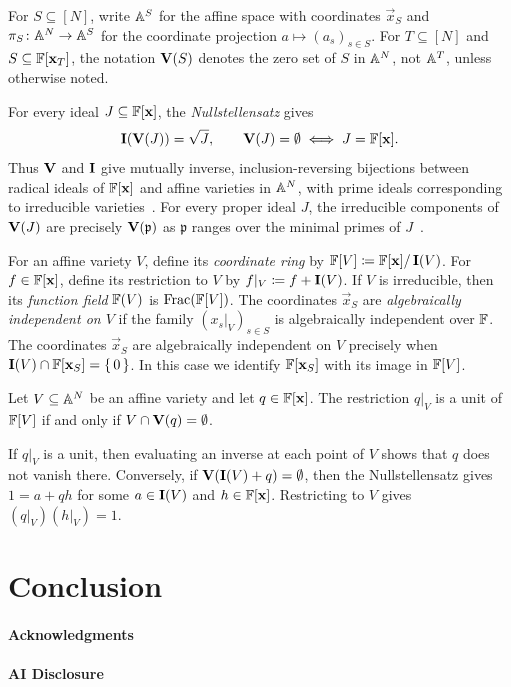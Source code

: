 \documentclass[11pt,letterpaper,dvipsnames]{article}
\begin{document}
For $S \subseteq [N]$, write $\mathbb{A}^S$ for the affine space with coordinates $\vec{x}_S$ and $\pi_S \colon \mathbb{A}^N \to \mathbb{A}^S$ for the coordinate projection $a \mapsto (a_s)_{s \in S}$.
For $T \subseteq [N]$ and $S \subseteq \F[\vec{x}_T]$, the notation $\operatorname{\mathbf{V}}(S)$ denotes the zero set of $S$ in $\mathbb{A}^N$, not $\mathbb{A}^T$, unless otherwise noted.

For every ideal $J \subseteq \F[\vec{x}]$, the \emph{Nullstellensatz} gives 
\[ 
    \I(\V(J)) = \sqrt{J}, \qquad \V(J) = \emptyset \iff J = \F[\vec{x}]. 
\]
Thus $\operatorname{\mathbf{V}}$ and $\operatorname{\mathbf{I}}$ give mutually inverse, inclusion-reversing bijections between radical ideals of $\F[\vec{x}]$ and affine varieties in $\mathbb{A}^N$, with prime ideals corresponding to irreducible varieties~\cite[Chapter~4, \S2, Theorems~6--7; \S5, Corollary~4]{CLO25}.
For every proper ideal $J$, the irreducible components of $\operatorname{\mathbf{V}}(J)$ are precisely $\operatorname{\mathbf{V}}(\mathfrak p)$ as $\mathfrak p$ ranges over the minimal primes of $J$~\cite[Corollary~I.1.4 and Proposition~I.1.5]{Har77}.

For an affine variety $V$, define its \emph{coordinate ring} by $\F[V] \defeq \F[\vec{x}]/\I(V)$.
For $f \in \F[\vec{x}]$, define its restriction to $V$ by $f|_V \coloneqq f + \operatorname{\mathbf{I}}(V)$.
If $V$ is irreducible, then its \emph{function field} $\mathbb{F}(V)$ is $\mathrm{Frac}(\mathbb{F}[V])$.
The coordinates $\vec{x}_S$ are \emph{algebraically independent on $V$} if the family $(x_s|_V)_{s \in S}$ is algebraically independent over $\mathbb{F}$.
The coordinates $\vec{x}_S$ are algebraically independent on $V$ precisely when $\I(V) \cap \F[\vec{x}_S] = \set{0}$.
In this case we identify $\F[\vec{x}_S]$ with its image in $\mathbb{F}[V]$.

\begin{lem}\label{lem:units}
    Let $V \subseteq \mathbb{A}^N$ be an affine variety and let $q \in \F[\vec{x}]$.
    The restriction $q|_V$ is a unit of $\mathbb{F}[V]$ if and only if $V \cap \operatorname{\mathbf{V}}(q) = \emptyset$.
\end{lem}
\begin{pf}
    If $q|_V$ is a unit, then evaluating an inverse at each point of $V$ shows that $q$ does not vanish there.
    Conversely, if $\V(\I(V) + \ideal{q}) = \emptyset$, then the Nullstellensatz gives $1 = a + qh$ for some $a \in \operatorname{\mathbf{I}}(V)$ and $h \in \F[\vec{x}]$.
    Restricting to $V$ gives $(q|_V)(h|_V) = 1$.
\end{pf}

\section{Conclusion}\label{sec:conclusion}

\paragraph{Acknowledgments}

\paragraph{AI Disclosure}


\printbibliography
\end{document}
